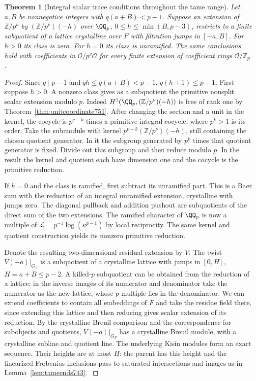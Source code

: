 \documentclass[a4paper,11pt]{article}
\newtheorem{theorem}[proposition]{Theorem}
\theoremstyle{definition}
\theoremstyle{remark}
\newcommand{\ZZ}{\mathbb Z}\newcommand{\ord}{\operatorname{ord}}
\numberwithin{equation}{section}
\begin{document}
\begin{theorem}[Integral scalar trace conditions throughout the tame range]
\leavevmode\label{thm:oldscalars752}
Let \(a,B\) be nonnegative integers with \(q(a+B)<p-1\).
Suppose an extension of \(\ZZ/p^\nu\) by
\((\ZZ/p^\nu)(-h)\) over \(\QQ_p\), \(0\le h\le\min(B,p-3)\),
restricts to a finite subquotient of a lattice crystalline over
\(F\) with filtration jumps in \([-a,B]\). For \(h>0\) its
class is zero. For \(h=0\) its class is unramified.
The same conclusions hold with coefficients in
\(\mathcal O/p^\nu\mathcal O\) for every finite extension of
coefficient rings \(\mathcal O/\ZZ_p\).
\end{theorem}
\begin{proof}
Since \(q\mid p-1\) and \(qh\le q(a+B)<p-1\),
\(q(h+1)\le p-1\).
First suppose \(h>0\). A nonzero class gives as a
subquotient the primitive nonsplit scalar extension modulo \(p\).
Indeed \(H^1(\QQ_p,(\ZZ/p^\nu)(-h))\) is free of rank one by
Theorem~\ref{thm:unitcoordinate751}. After changing the section
and a unit in the kernel, the cocycle is \(p^{\nu-k}\) times a
primitive integral cocycle, where \(p^k>1\) is its order. Take
the submodule with kernel \(p^{\nu-k}(\ZZ/p^\nu)(-h)\), still
containing the chosen quotient generator. In it the subgroup
generated by \(p^k\) times that quotient generator is fixed.
Divide out this subgroup and then reduce modulo \(p\). In the
result the kernel and quotient each have dimension one and the
cocycle is the primitive reduction.

If \(h=0\) and the class is ramified, first subtract its
unramified part. This is a Baer sum with the reduction of an
integral unramified extension, crystalline with jumps zero.
The diagonal pullback and addition pushout are subquotients of
the direct sum of the two extensions. The ramified character of
\(\QQ_p\) is now a multiple of
\(\mathcal L=p^{-1}\log(\kappa^{p-1})\) by local reciprocity.
The same kernel and quotient construction yields its nonzero
primitive reduction.

Denote the resulting two-dimensional residual extension by \(V\).
The twist \(V(-a)|_{G_F}\) is a subquotient of a crystalline
lattice with jumps in \([0,H]\), \(H=a+B\le p-2\). A killed-\(p\)
subquotient can be obtained from the reduction of a lattice:
in the inverse images of its numerator and denominator take the
numerator as the new lattice, whose \(p\)-multiple lies in the
denominator. We can extend coefficients to contain all embeddings
of \(F\) and take the residue field there, since extending this
lattice and then reducing gives scalar extension of its reduction.
By the crystalline Breuil comparison and the correspondence for
subobjects and quotients, \(V(-a)|_{G_F}\) has a crystalline
Breuil module, with a crystalline subline and quotient line.
The underlying Kisin modules form an exact sequence. Their
heights are at most \(H\): the parent has this height and the
linearized Frobenius inclusions pass to saturated intersections
and images as in Lemma~\ref{lem:tameends743}.
\cite[Theorems~2.1.4 and~2.1.5 and \S2.1]{III-II-bcgntmonodromy752}


\end{proof}
\end{document}
